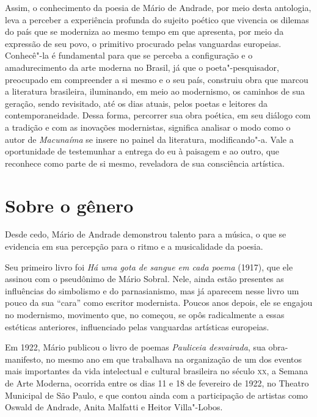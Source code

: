 Assim, o conhecimento da poesia de Mário de Andrade, por meio desta
antologia, leva a perceber a experiência profunda do sujeito poético que
vivencia os dilemas do país que se moderniza ao mesmo tempo em que
apresenta, por meio da expressão de seu povo, o primitivo procurado
pelas vanguardas europeias. Conhecê"-la é fundamental para que se perceba
a configuração e o amadurecimento da arte moderna no Brasil, já que o
poeta"-pesquisador, preocupado em compreender a si mesmo e o seu país,
construiu obra que marcou a literatura brasileira, iluminando, em meio
ao modernismo, os caminhos de sua geração, sendo revisitado, até os dias
atuais, pelos poetas e leitores da contemporaneidade. Dessa forma,
percorrer sua obra poética, em seu diálogo com a tradição e com as
inovações modernistas, significa analisar o modo como o autor de
\emph{Macunaíma} se insere no painel da literatura, modificando"-a. Vale
a oportunidade de testemunhar a entrega do eu à paisagem e ao outro, que
reconhece como parte de si mesmo, reveladora de sua consciência
artística.


\section{Sobre o gênero}

Desde cedo, Mário de Andrade demonstrou talento para a música, o que se evidencia em sua percepção para o ritmo e a musicalidade da poesia.

Seu primeiro livro foi \emph{Há uma gota de sangue em cada poema}
(1917), que ele assinou com o pseudônimo de Mário Sobral. Nele, ainda
estão presentes as influências do simbolismo e do parnasianismo, mas já
aparecem nesse livro um pouco da sua ``cara'' como escritor modernista.
Poucos anos depois, ele se engajou no modernismo, movimento que, no
começou, se opôs radicalmente a essas estéticas anteriores, influenciado
pelas vanguardas artísticas europeias.

Em 1922, Mário publicou o livro de poemas \emph{Pauliceia desvairada},
sua obra-manifesto, no mesmo ano em que trabalhava na organização de um
dos eventos mais importantes da vida intelectual e cultural brasileira
no século \textsc{xx}, a Semana de Arte Moderna, ocorrida entre os dias 11 e 18
de fevereiro de 1922, no Theatro Municipal de São Paulo, e que contou
ainda com a participação de artistas como Oswald de Andrade, Anita
Malfatti e Heitor Villa"-Lobos.


